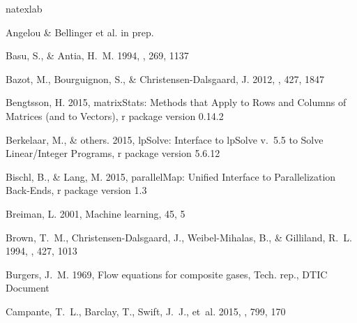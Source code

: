 \documentclass[manuscript,linenumbers]{aastex6}
\begin{document}
%
%
\begin{thebibliography}{}
\expandafter\ifx\csname natexlab\endcsname\relax\def\natexlab#1{#1}\fi

{Angelou \& Bellinger et al.} in prep. 

{Basu}, S., \& {Antia}, H.~M. 1994, \mnras, 269, 1137

{Bazot}, M., {Bourguignon}, S., \& {Christensen-Dalsgaard}, J. 2012, \mnras,
  427, 1847

Bengtsson, H. 2015, matrixStats: Methods that Apply to Rows and Columns of
  Matrices (and to Vectors), r package version 0.14.2

Berkelaar, M., \& {others}. 2015, lpSolve: Interface to lpSolve v.~5.5 to Solve
  Linear/Integer Programs, r package version 5.6.12

Bischl, B., \& Lang, M. 2015, parallelMap: Unified Interface to Parallelization
  Back-Ends, r package version 1.3

Breiman, L. 2001, Machine learning, 45, 5

{Brown}, T.~M., {Christensen-Dalsgaard}, J., {Weibel-Mihalas}, B., \&
  {Gilliland}, R.~L. 1994, \apj, 427, 1013

Burgers, J.~M. 1969, Flow equations for composite gases, Tech. rep., DTIC
  Document

{Campante}, T.~L., {Barclay}, T., {Swift}, J.~J., {et~al.} 2015, \apj, 799, 170


\end{thebibliography}
\end{document}
